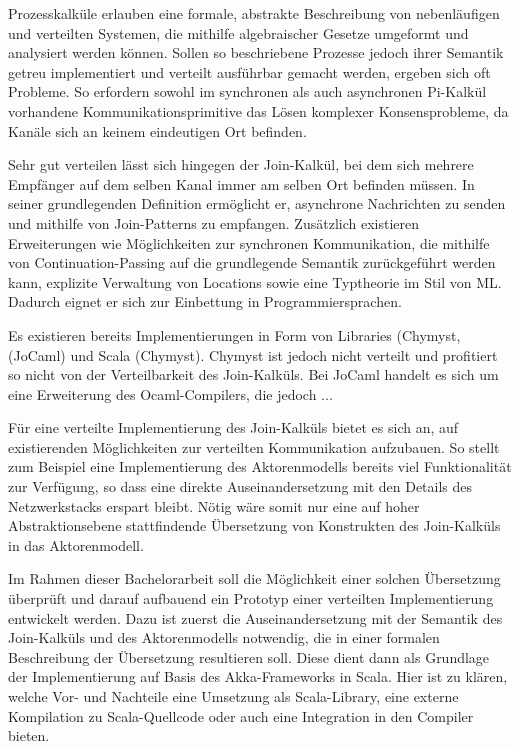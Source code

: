 \documentclass[12pt]{article}
\begin{document}
\maketitle

Prozesskalküle erlauben eine formale, abstrakte Beschreibung von nebenläufigen und verteilten Systemen, die mithilfe algebraischer Gesetze umgeformt und analysiert werden können.
Sollen so beschriebene Prozesse jedoch ihrer Semantik getreu implementiert und verteilt ausführbar gemacht werden, ergeben sich oft Probleme.
So erfordern sowohl im synchronen als auch asynchronen Pi-Kalkül vorhandene Kommunikationsprimitive das Lösen komplexer Konsensprobleme, da Kanäle sich an keinem eindeutigen Ort befinden.

Sehr gut verteilen lässt sich hingegen der Join-Kalkül, bei dem sich mehrere Empfänger auf dem selben Kanal immer am selben Ort befinden müssen.
In seiner grundlegenden Definition ermöglicht er, asynchrone Nachrichten zu senden und mithilfe von Join-Patterns zu empfangen.
Zusätzlich existieren Erweiterungen wie Möglichkeiten zur synchronen Kommunikation, die mithilfe von Continuation-Passing auf die grundlegende Semantik zurückgeführt werden kann, explizite Verwaltung von Locations sowie eine Typtheorie im Stil von ML. Dadurch eignet er sich zur Einbettung in Programmiersprachen.

Es existieren bereits Implementierungen in Form von Libraries (Chymyst,  (JoCaml) und Scala (Chymyst). Chymyst ist jedoch nicht verteilt und profitiert so nicht von der Verteilbarkeit des Join-Kalküls. Bei JoCaml handelt es sich um eine Erweiterung des Ocaml-Compilers, die jedoch ...

Für eine verteilte Implementierung des Join-Kalküls bietet es sich an, auf existierenden Möglichkeiten zur verteilten Kommunikation aufzubauen.
So stellt zum Beispiel eine Implementierung des Aktorenmodells bereits viel Funktionalität zur Verfügung, so dass eine direkte Auseinandersetzung mit den Details des Netzwerkstacks erspart bleibt.
Nötig wäre somit nur eine auf hoher Abstraktionsebene stattfindende Übersetzung von Konstrukten des Join-Kalküls in das Aktorenmodell.

Im Rahmen dieser Bachelorarbeit soll die Möglichkeit einer solchen Übersetzung überprüft und darauf aufbauend ein Prototyp einer verteilten Implementierung entwickelt werden.
Dazu ist zuerst die Auseinandersetzung mit der Semantik des Join-Kalküls und des Aktorenmodells notwendig, die in einer formalen Beschreibung der Übersetzung resultieren soll.
Diese dient dann als Grundlage der Implementierung auf Basis des Akka-Frameworks in Scala.
Hier ist zu klären, welche Vor- und Nachteile eine Umsetzung als Scala-Library, eine externe Kompilation zu Scala-Quellcode oder auch eine Integration in den Compiler bieten.
\end{document}
